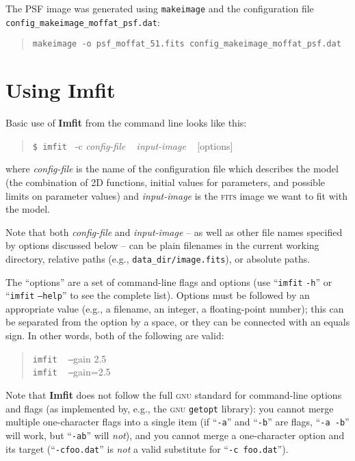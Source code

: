 \documentclass[10pt,a4paper,article]{memoir}
\newcommand{\imfit}{\textbf{Imfit}}
\newcommand{\Imfit}{\textbf{Imfit}}
\newcommand{\imfitprog}{\texttt{imfit}}
\newcommand{\makeimage}{\texttt{makeimage}}
\begin{document}
The PSF image was generated using \makeimage{} and the configuration
file \\
\texttt{config\_makeimage\_moffat\_psf.dat}:
\begin{quote}
\texttt{makeimage -o psf\_moffat\_51.fits config\_makeimage\_moffat\_psf.dat}
\end{quote}




\newpage

\chapter{Using \Imfit{}}\label{sec:using-imfit}\label{chap:using-imfit}

Basic use of \imfit{} from the command line looks like this:
\begin{quote}
  \texttt{\$ \imfitprog{} }  -c \textit{config-file} ~ \textit{input-image} ~ [options]
\end{quote}
where \textit{config-file} is the name of the configuration file
which describes the model (the combination of 2D functions, initial values
for parameters, and possible limits on parameter values) and \textit{input-image}
is the \textsc{fits} image we want to fit with the model. 

Note that both \textit{config-file} and \textit{input-image} -- as well
as other file names specified by options discussed below -- can be plain
filenames in the current working directory, relative paths (e.g.,
\texttt{data\_dir/image.fits}), or absolute paths.

The ``options'' are a set of command-line flags and options (use ``\imfitprog{} \texttt{-h}''
or ``\imfitprog{} \texttt{--help}'' to see the complete list). Options must be followed by
an appropriate value (e.g., a filename, an integer, a floating-point number); this can
be separated from the option by a space, or they can be connected with an equals sign.
In other words, both of the following are valid:
\begin{quote}
\imfitprog{} ~ \texttt{--}gain 2.5 \\
\imfitprog{} ~ \texttt{--}gain=2.5
\end{quote}
Note that \imfit{} does not follow the full \textsc{gnu} standard for
command-line options and flags (as implemented by, e.g., the \textsc{gnu}
\texttt{getopt} library): you cannot merge multiple one-character flags
into a single item (if ``\texttt{-a}'' and ``\texttt{-b}'' are flags,
``\texttt{-a -b}'' will work, but ``\texttt{-ab}'' will \textit{not}), and you
cannot merge a one-character option and its target
(``\texttt{-cfoo.dat}'' is \textit{not} a valid substitute for
``\texttt{-c foo.dat}'').
\end{document}
